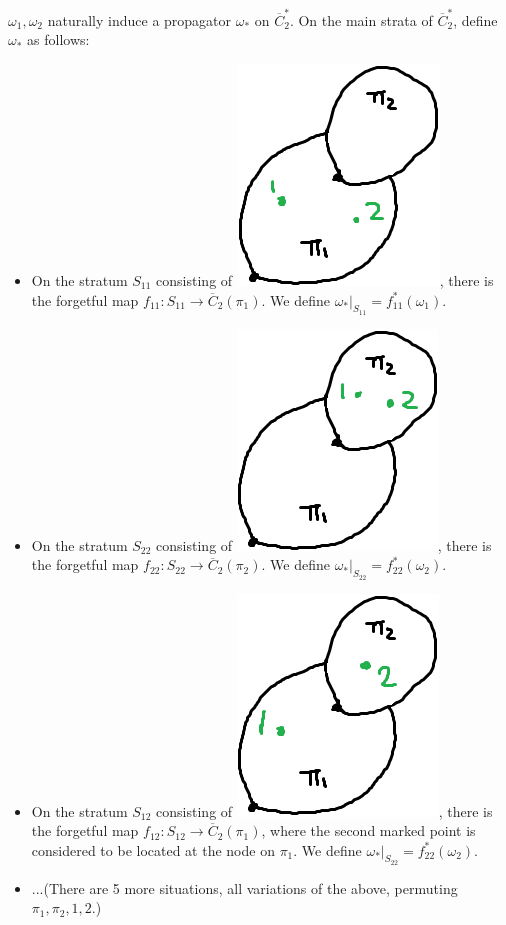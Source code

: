 \documentclass[11pt]{article}
\theoremstyle{definition}
\theoremstyle{remark}
\def\ov#1{\overline{#1}}
\begin{document}
$\omega_1,\omega_2$ naturally induce a propagator $\omega_*$ on $\ov{C}^*_2$. On the main strata of $\ov{C}^*_2$, define $\omega_*$ as follows: 
\begin{itemize}
\item On the stratum $S_{11}$ consisting of  \includegraphics[scale=0.4]{mouse11}, 
there is the forgetful map
$f_{11}:S_{11}\to \ov{C}_2(\pi_1)$. We define $\omega_*|_{S_{11}}=f_{11}^*(\omega_1)$. 

\item On the stratum $S_{22}$ consisting of  \includegraphics[scale=0.4]{mouse22}, 
there is the forgetful map
$f_{22}:S_{22}\to \ov{C}_2(\pi_2)$. We define $\omega_*|_{S_{22}}=f_{22}^*(\omega_2)$. 

\item On the stratum $S_{12}$ consisting of  \includegraphics[scale=0.4]{mouse12}, 
there is the forgetful map
$f_{12}:S_{12}\to \ov{C}_2(\pi_1)$, where the second marked point is considered to be located at the node on $\pi_1$.  
We define $\omega_*|_{S_{22}}=f_{22}^*(\omega_2)$.

\item ...(There are 5 more situations, all variations of the above, permuting $\pi_1,\pi_2, 1,2$.) 
\end{itemize}
\end{document}
